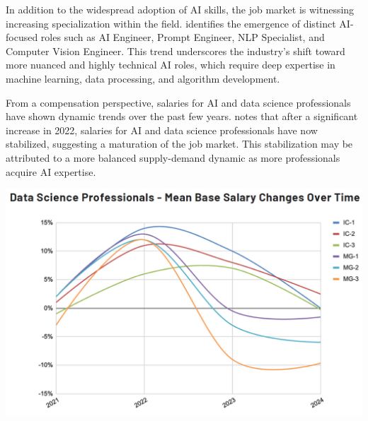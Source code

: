 \documentclass[12pt,a4paper]{article}
\begin{document}
\begin{multicols}{2}
In addition to the widespread adoption of AI skills, the job market is witnessing increasing specialization within the field. \cite{wids2024salary} identifies the emergence of distinct AI-focused roles such as AI Engineer, Prompt Engineer, NLP Specialist, and Computer Vision Engineer. This trend underscores the industry's shift toward more nuanced and highly technical AI roles, which require deep expertise in machine learning, data processing, and algorithm development.

From a compensation perspective, salaries for AI and data science professionals have shown dynamic trends over the past few years. \cite{wids2024salary} notes that after a significant increase in 2022, salaries for AI and data science professionals have now stabilized, suggesting a maturation of the job market. This stabilization may be attributed to a more balanced supply-demand dynamic as more professionals acquire AI expertise.

\includegraphics[width=\linewidth]{Data_Scientist_Salary.jpg}
\label{fig:Data_Scientist}


\end{multicols}
\end{document}
